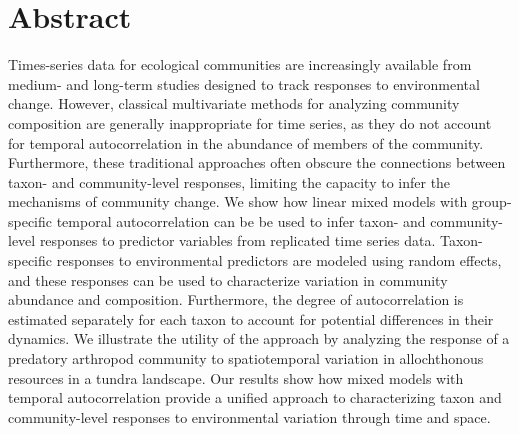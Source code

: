 
\section*{Abstract}

Times-series data for ecological communities are increasingly available
from medium- and long-term studies designed to track responses
to environmental change. However, classical multivariate methods for
analyzing community composition are generally inappropriate for time series,
as they do not account for temporal autocorrelation
in the abundance of members of the community.
Furthermore, these traditional approaches often obscure the connections between
taxon- and community-level responses, limiting the capacity to
infer the mechanisms of community change.
We show how linear mixed models with group-specific temporal autocorrelation
can be be used to infer taxon- and community-level responses
to predictor variables from replicated time series data.
Taxon-specific responses to environmental predictors are modeled
using random effects, and these responses can be used to characterize
variation in community abundance and composition.
Furthermore, the degree of autocorrelation is
estimated separately for each taxon
to account for potential differences in their dynamics.
We illustrate the utility of the approach
by analyzing the response of a predatory arthropod community to
spatiotemporal variation in allochthonous resources in a tundra landscape.
Our results show how mixed models with temporal autocorrelation provide
a unified approach to characterizing taxon and community-level
responses to environmental variation through time and space.
